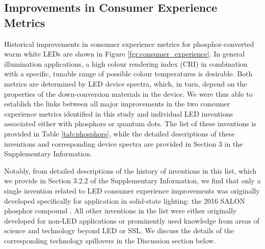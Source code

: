 \documentclass[parskip=full]{article}
\begin{document}
\subsection{Improvements in Consumer Experience Metrics}

Historical improvements in consumer experience metrics for phosphor-converted warm white LEDs are shown in Figure \ref{fgr:consumer_experience}. In general illumination applications, a high colour rendering index (CRI) in combination with a specific, tunable range of possible colour temperatures is desirable. Both metrics are determined by LED device spectra, which, in turn, depend on the properties of the down-conversion materials in the device. We were thus able to establish the links between all major improvements in the two consumer experience metrics identified in this study and individual LED inventions associated either with phosphors or quantum dots. The list of these inventions is provided in Table \ref{tab:phosphors}, while the detailed descriptions of these inventions and corresponding device spectra are provided in Section 3 in the Supplementary Information.

Notably, from detailed descriptions of the history of inventions in this list, which we provide in Section 3.2.2 of the Supplementary Information, we find that only a single invention related to LED consumer experience improvements was originally developed specifically for application in solid-state lighting: the 2016 SALON phosphor compound \cite{seibald2019phosphor,Hoerder2019}. All other inventions in the list were either originally developed for non-LED applications or prominently used knowledge from areas of science and technology beyond LED or SSL. We discuss the details of the corresponding technology spillovers in the Discussion section below.
\end{document}
